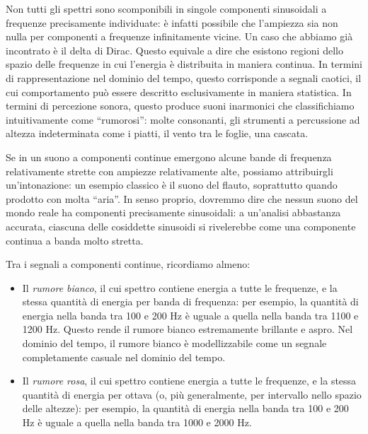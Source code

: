 Non tutti gli spettri sono scomponibili in singole componenti sinusoidali a frequenze precisamente individuate: è infatti possibile che l'ampiezza sia non nulla per componenti a frequenze infinitamente vicine. Un caso che abbiamo già incontrato è il delta di Dirac. Questo equivale a dire che esistono regioni dello spazio delle frequenze in cui l'energia è distribuita in maniera continua. In termini di rappresentazione nel dominio del tempo, questo corrisponde a segnali caotici, il cui comportamento può essere descritto esclusivamente in maniera statistica. In termini di percezione sonora, questo produce suoni inarmonici che classifichiamo intuitivamente come ``rumorosi'': molte consonanti, gli strumenti a percussione ad altezza indeterminata come i piatti, il vento tra le foglie, una cascata.

Se in un suono a componenti continue emergono alcune bande di frequenza relativamente strette con ampiezze relativamente alte, possiamo attribuirgli un'intonazione: un esempio classico è il suono del flauto, soprattutto quando prodotto con molta ``aria''. In senso proprio, dovremmo dire che nessun suono del mondo reale ha componenti precisamente sinusoidali: a un'analisi abbastanza accurata, ciascuna delle cosiddette sinusoidi si rivelerebbe come una componente continua a banda molto stretta.

Tra i segnali a componenti continue, ricordiamo almeno:

\begin{itemize}

\item Il \emph{rumore bianco}, il cui spettro contiene energia a tutte le frequenze, e la stessa quantità di energia per banda di frequenza: per esempio, la quantità di energia nella banda tra 100 e 200 Hz è uguale a quella nella banda tra 1100 e 1200 Hz. Questo rende il rumore bianco estremamente brillante e aspro. Nel dominio del tempo, il rumore bianco è modellizzabile come un segnale completamente casuale nel dominio del tempo.

\item Il \emph{rumore rosa}, il cui spettro contiene energia a tutte le frequenze, e la stessa quantità di energia per ottava (o, più generalmente, per intervallo nello spazio delle altezze): per esempio, la quantità di energia nella banda tra 100 e 200 Hz è uguale a quella nella banda tra 1000 e 2000 Hz. 

\end{itemize}



